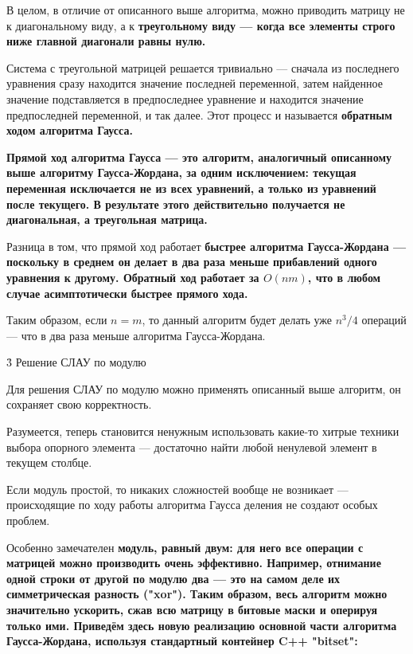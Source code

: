 В целом, в отличие от описанного выше алгоритма, можно приводить матрицу не к диагональному виду, а к \bf{треугольному виду} --- когда все элементы строго ниже главной диагонали равны нулю.

Система с треугольной матрицей решается тривиально --- сначала из последнего уравнения сразу находится значение последней переменной, затем найденное значение подставляется в предпоследнее уравнение и находится значение предпоследней переменной, и так далее. Этот процесс и называется \bf{обратным ходом} алгоритма Гаусса.

\bf{Прямой ход} алгоритма Гаусса --- это алгоритм, аналогичный описанному выше алгоритму Гаусса-Жордана, за одним исключением: текущая переменная исключается не из всех уравнений, а только из уравнений после текущего. В результате этого действительно получается не диагональная, а треугольная матрица.

Разница в том, что прямой ход работает \bf{быстрее} алгоритма Гаусса-Жордана --- поскольку в среднем он делает в два раза меньше прибавлений одного уравнения к другому. Обратный ход работает за $O(nm)$, что в любом случае асимптотически быстрее прямого хода.

Таким образом, если $n=m$, то данный алгоритм будет делать уже $n^3/4$ операций --- что в два раза меньше алгоритма Гаусса-Жордана.


\h3{ Решение СЛАУ по модулю }

Для решения СЛАУ по модулю можно применять описанный выше алгоритм, он сохраняет свою корректность.

Разумеется, теперь становится ненужным использовать какие-то хитрые техники выбора опорного элемента --- достаточно найти любой ненулевой элемент в текущем столбце.

Если модуль простой, то никаких сложностей вообще не возникает --- происходящие по ходу работы алгоритма Гаусса деления не создают особых проблем.

Особенно замечателен \bf{модуль, равный двум}: для него все операции с матрицей можно производить очень эффективно. Например, отнимание одной строки от другой по модулю два --- это на самом деле их симметрическая разность ("xor"). Таким образом, весь алгоритм можно значительно ускорить, сжав всю матрицу в битовые маски и оперируя только ими. Приведём здесь новую реализацию основной части алгоритма Гаусса-Жордана, используя стандартный контейнер C++ "bitset":


